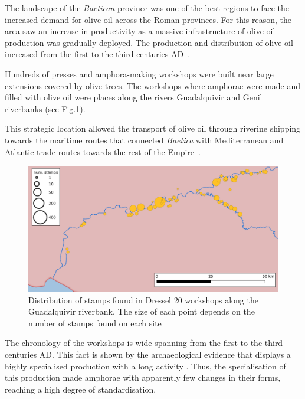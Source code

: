 \documentclass[review]{elsarticle}
\begin{document}
The landscape of the \textit{Baetican} province was one of the best regions to face the increased demand for olive oil across the Roman provinces. For this reason, the area saw an increase in productivity as a massive infrastructure of olive oil production was gradually deployed. The production and distribution of olive oil increased from the first to the third centuries AD~\citep{remesal_concierto}. 


Hundreds of presses and amphora-making workshops were built near large extensions covered by olive trees. The workshops where amphorae were made and filled with olive oil were places along the rivers Guadalquivir and Genil riverbanks (see Fig.\ref{workshop}).

This strategic location allowed the transport of olive oil through riverine shipping towards the maritime routes that connected \textit{Baetica} with Mediterranean and Atlantic trade routes towards the rest of the Empire~\citep{garcia_vargas_enrique_formal_2010}.

\begin{figure}[htp]
	\centering
\includegraphics[width=\linewidth]{figs/baetica}
\caption{Distribution of stamps found in Dressel 20 workshops along the Guadalquivir riverbank. The size of each point depends on the number of stamps found on each site}

\label{workshop}
\end{figure} 


The chronology of the workshops is wide spanning from the first to the third centuries AD\citep{millet_anforas_1998,rodriguez_baetican_1998,chic2005comercio}. 
This fact is shown by the archaeological evidence that displays a highly specialised production with a long activity \citep{remesal_anforas_2004}. Thus, the specialisation of this production made amphorae with apparently few changes in their forms, reaching a high degree of standardisation. 
\end{document}
